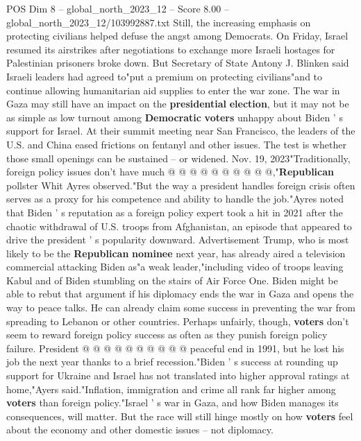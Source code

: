 \begin{textsample}{POS Dim 8 – global\_north\_2023\_12 – Score 8.00 – global\_north\_2023\_12/103992887.txt}
Still, the increasing emphasis on protecting civilians helped defuse the angst among Democrats.
On Friday, Israel resumed its airstrikes after negotiations to exchange more Israeli hostages for Palestinian prisoners broke down.
But Secretary of State Antony J.
Blinken said Israeli leaders had agreed to"put a premium on protecting civilians"and to continue allowing humanitarian aid supplies to enter the war zone.
The war in Gaza may still have an impact on the \textbf{presidential} \textbf{election}, but it may not be as simple as low turnout among \textbf{Democratic} \textbf{voters} unhappy about Biden ' s support for Israel.
At their summit meeting near San Francisco, the leaders of the U.S. and China eased frictions on fentanyl and other issues.
The test is whether those small openings can be sustained -- or widened.
Nov. 19, 2023"Traditionally, foreign policy issues don't have much @ @ @ @ @ @ @ @ @ @,"\textbf{Republican} pollster Whit Ayres observed."But the way a president handles foreign crisis often serves as a proxy for his competence and ability to handle the job."Ayres noted that Biden ' s reputation as a foreign policy expert took a hit in 2021 after the chaotic withdrawal of U.S. troops from Afghanistan, an episode that appeared to drive the president ' s popularity downward.
Advertisement Trump, who is most likely to be the \textbf{Republican} \textbf{nominee} next year, has already aired a television commercial attacking Biden as"a weak leader,"including video of troops leaving Kabul and of Biden stumbling on the stairs of Air Force One.
Biden might be able to rebut that argument if his diplomacy ends the war in Gaza and opens the way to peace talks.
He can already claim some success in preventing the war from spreading to Lebanon or other countries.
Perhaps unfairly, though, \textbf{voters} don't seem to reward foreign policy success as often as they punish foreign policy failure.
President @ @ @ @ @ @ @ @ @ @ peaceful end in 1991, but he lost his job the next year thanks to a brief recession."Biden ' s success at rounding up support for Ukraine and Israel has not translated into higher approval ratings at home,"Ayers said."Inflation, immigration and crime all rank far higher among \textbf{voters} than foreign policy."Israel ' s war in Gaza, and how Biden manages its consequences, will matter.
But the race will still hinge mostly on how \textbf{voters} feel about the economy and other domestic issues -- not diplomacy.

\end{textsample}
